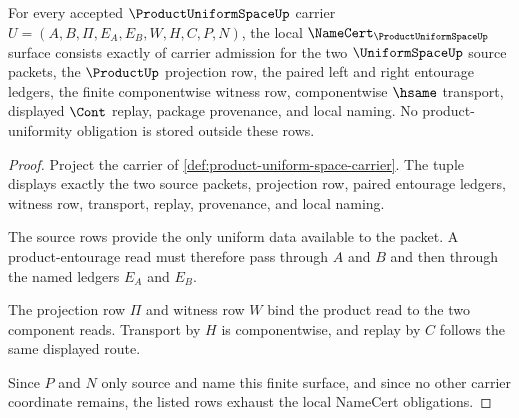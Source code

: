\begin{theorem}
\label{thm:product-uniform-space-namecert-obligations}
For every accepted $\ProductUniformSpaceUp$ carrier $U=(A,B,\Pi,E_A,E_B,W,H,C,P,N)$, the local $\NameCert_{\ProductUniformSpaceUp}$ surface consists exactly of carrier admission for the two $\UniformSpaceUp$ source packets, the $\ProductUp$ projection row, the paired left and right entourage ledgers, the finite componentwise witness row, componentwise $\hsame$ transport, displayed $\Cont$ replay, package provenance, and local naming. No product-uniformity obligation is stored outside these rows.
\end{theorem}
\begin{proof}
Project the carrier of \autoref{def:product-uniform-space-carrier}. The tuple displays exactly the two source packets, projection row, paired entourage ledgers, witness row, transport, replay, provenance, and local naming.

The source rows provide the only uniform data available to the packet. A product-entourage read must therefore pass through $A$ and $B$ and then through the named ledgers $E_A$ and $E_B$.

The projection row $\Pi$ and witness row $W$ bind the product read to the two component reads. Transport by $H$ is componentwise, and replay by $C$ follows the same displayed route.

Since $P$ and $N$ only source and name this finite surface, and since no other carrier coordinate remains, the listed rows exhaust the local NameCert obligations.
\end{proof}

